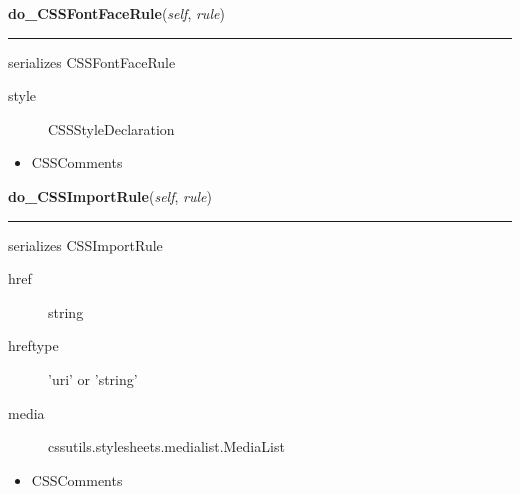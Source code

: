     \label{cssutils:serialize:CSSSerializer:do_CSSFontFaceRule}

    \vspace{0.5ex}

\hspace{.8\funcindent}\begin{boxedminipage}{\funcwidth}

    \raggedright \textbf{do\_CSSFontFaceRule}(\textit{self}, \textit{rule})

    \vspace{-1.5ex}

    \rule{\textwidth}{0.5\fboxrule}
\setlength{\parskip}{2ex}

serializes CSSFontFaceRule
\begin{description}
\item[{style}] \leavevmode 
CSSStyleDeclaration

\end{description}
\begin{itemize}
\item {} 
CSSComments

\end{itemize}
\setlength{\parskip}{1ex}
    \end{boxedminipage}

    \label{cssutils:serialize:CSSSerializer:do_CSSImportRule}

    \vspace{0.5ex}

\hspace{.8\funcindent}\begin{boxedminipage}{\funcwidth}

    \raggedright \textbf{do\_CSSImportRule}(\textit{self}, \textit{rule})

    \vspace{-1.5ex}

    \rule{\textwidth}{0.5\fboxrule}
\setlength{\parskip}{2ex}

serializes CSSImportRule
\begin{description}
\item[{href}] \leavevmode 
string

\item[{hreftype}] \leavevmode 
'uri' or 'string'

\item[{media}] \leavevmode 
cssutils.stylesheets.medialist.MediaList

\end{description}
\begin{itemize}
\item {} 
CSSComments

\end{itemize}
\setlength{\parskip}{1ex}
    \end{boxedminipage}

